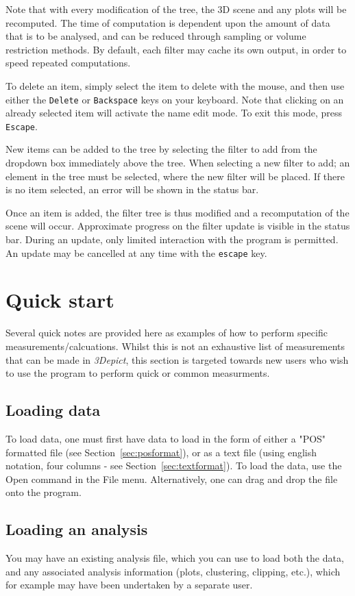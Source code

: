 \documentclass[10pt]{article}
\begin{document}
Note that with every modification of the tree, the 3D scene and any plots will be recomputed. The time of computation is dependent upon the amount of data that is to be analysed, and can be reduced through sampling or volume restriction methods. By default, each filter may cache its own output, in order to speed repeated computations.

To delete an item, simply select the item to delete with the mouse, and then use either the \texttt{Delete}  or  \texttt{Backspace} keys on your keyboard. Note that clicking on an already selected item will activate the name edit mode. To exit this mode, press \texttt{Escape}. 

New items can be added to the tree by selecting the filter to add from the dropdown box immediately above the tree. When selecting a new filter to add; an element in the tree must be selected, where the new filter will be placed. If there is no item selected, an error will be shown in the status bar.  

Once an item is added, the filter tree is thus modified and a recomputation of the scene will occur. Approximate progress on the filter update is visible in the status bar. During an update, only limited interaction with the program is permitted. An update may be cancelled at any time with the \texttt{escape} key. 


\section{Quick start}
Several quick notes are provided here as examples of how to perform specific measurements/calcuations. Whilst this is not an exhaustive list of measurements that can be made in \emph{3Depict}, this section is targeted towards new users who wish to use the program to perform quick or common measurments.

\subsection{Loading data}
\label{sec:quickStartLoadData}
To load data, one must first have data to load in the form of either a "POS" formatted file (see Section~\ref{sec:posformat}), or as a text file (using english notation, four columns - see Section~\ref{sec:textformat}). To load the data, use the Open command in the File menu. Alternatively, one can drag and drop the file onto the program.

\subsection{Loading an analysis}
You may have an existing analysis file, which you can use to load both the data, and any associated analysis information (plots, clustering, clipping, etc.), which for example may have been undertaken by a separate user. 
\end{document}
